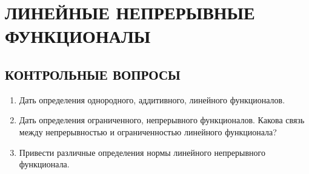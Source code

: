 \documentclass[12pt,a4paper]{article}
\begin{document}
\section{ЛИНЕЙНЫЕ НЕПРЕРЫВНЫЕ ФУНКЦИОНАЛЫ}

\subsection*{КОНТРОЛЬНЫЕ ВОПРОСЫ}
\begin{enumerate}
\item Дать определения однородного, аддитивного, линейного функционалов.
\item Дать определения ограниченного, непрерывного функционалов. Какова связь между непрерывностью и ограниченностью линейного функционала?
\item Привести различные определения нормы линейного непрерывного функционала.
\end{enumerate}
\end{document}
